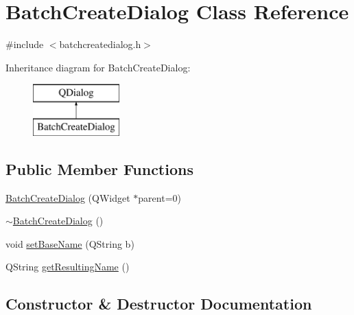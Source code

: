 \hypertarget{class_batch_create_dialog}{}\section{Batch\+Create\+Dialog Class Reference}
\label{class_batch_create_dialog}


{\ttfamily \#include $<$batchcreatedialog.\+h$>$}

Inheritance diagram for Batch\+Create\+Dialog\+:\begin{figure}[H]
\begin{center}
\leavevmode
\includegraphics[height=2.000000cm]{dc/d95/class_batch_create_dialog}
\end{center}
\end{figure}
\subsection*{Public Member Functions}
\begin{DoxyCompactItemize}
\item 
\mbox{\hyperlink{class_batch_create_dialog_a162a7d125ebed9e66bb3d2c334200eee}{Batch\+Create\+Dialog}} (Q\+Widget $\ast$parent=0)
\item 
\mbox{\hyperlink{class_batch_create_dialog_a667c7d8c5242d3b27bdfc991c3a82dbd}{$\sim$\+Batch\+Create\+Dialog}} ()
\item 
void \mbox{\hyperlink{class_batch_create_dialog_a104b8ee142793a84e8fd1616d4efcad9}{set\+Base\+Name}} (Q\+String b)
\item 
Q\+String \mbox{\hyperlink{class_batch_create_dialog_a3f48dcc2273fdc5f758b780447688795}{get\+Resulting\+Name}} ()
\end{DoxyCompactItemize}


\subsection{Constructor \& Destructor Documentation}
\mbox{\label{class_batch_create_dialog_a162a7d125ebed9e66bb3d2c334200eee}} 
